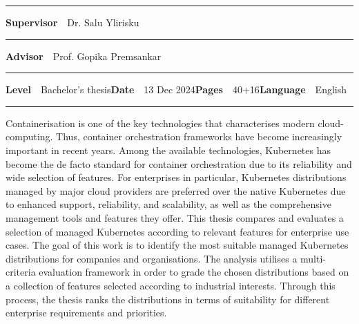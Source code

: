 \begin{spacing}{.88}
{\vspace{-2.4mm}\rule{\textwidth}{.75pt}

{\fontsize{10.5pt}{10.5pt}\bfseries\sffamily\lsstyle Supervisor}~~{\small Dr. Salu Ylirisku}

\vspace{-2.4mm}\rule{\textwidth}{.75pt}

{\fontsize{10.5pt}{10.5pt}\bfseries\sffamily\lsstyle Advisor}~~{\small Prof. Gopika Premsankar}

\vspace{-2.4mm}\rule{\textwidth}{.75pt}

{\fontsize{10.5pt}{10.5pt}\bfseries\sffamily\lsstyle Level}~~{\small Bachelor's thesis}\hfill{\fontsize{10.5pt}{10.5pt}\bfseries\sffamily\lsstyle Date}~~{\small 13 Dec 2024}\hfill{\fontsize{10.5pt}{10.5pt}\bfseries\sffamily\lsstyle Pages}~~{\small 40+16}\hfill{\fontsize{10.5pt}{10.5pt}\bfseries\sffamily\lsstyle Language}~~{\small English}

\vspace{-2.4mm}\rule{\textwidth}{.75pt}

\vspace{6mm}

} %
\end{spacing}
\begin{spacing}{1.05}

\vspace{.8mm}

{\small
  Containerisation is one of the key technologies that characterises modern cloud-computing. Thus, container orchestration frameworks have become increasingly important in recent years. Among the available technologies, Kubernetes has become the de facto standard for container orchestration due to its reliability and wide selection of features. For enterprises in particular, Kubernetes distributions managed by major cloud providers are preferred over the native Kubernetes due to enhanced support, reliability, and scalability, as well as the comprehensive management tools and features they offer. This thesis compares and evaluates a selection of managed Kubernetes according to relevant features for enterprise use cases. The goal of this work is to identify the most suitable managed Kubernetes distributions for companies and organisations. The analysis utilises a multi-criteria evaluation framework in order to grade the chosen distributions based on a collection of features selected according to industrial interests. Through this process, the thesis ranks the distributions in terms of suitability for different enterprise requirements and priorities.
}

\vfill

\end{spacing}
